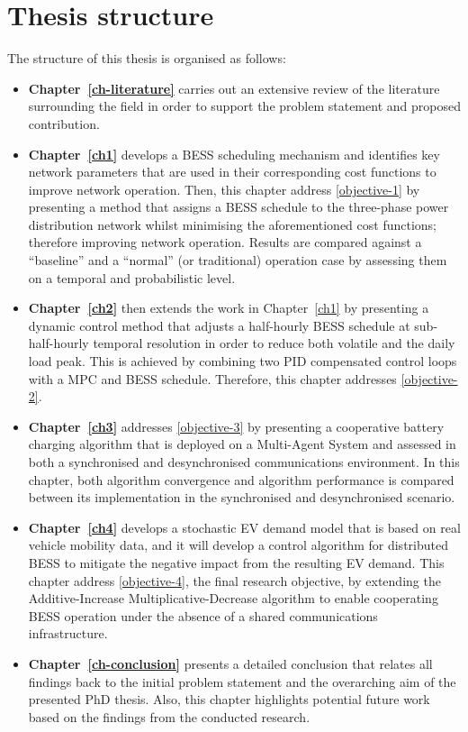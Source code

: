 \section{Thesis structure}
\label{ch-introduction:sec:thesis-structure}

The structure of this thesis is organised as follows:

\begin{itemize}
	\item
	\textbf{Chapter~\ref{ch-literature}} carries out an extensive review of the literature surrounding the field in order to support the problem statement and proposed contribution.
	\item
	\textbf{Chapter~\ref{ch1}} develops a BESS scheduling mechanism and identifies key network parameters that are used in their corresponding cost functions to improve network operation.
	Then, this chapter address \ref{objective-1} by presenting a method that assigns a BESS schedule to the three-phase power distribution network whilst minimising the aforementioned cost functions; therefore improving network operation.
	Results are compared against a ``baseline'' and a ``normal'' (or traditional) operation case by assessing them on a temporal and probabilistic level.
	\item
	\textbf{Chapter~\ref{ch2}} then extends the work in Chapter~\ref{ch1} by presenting a dynamic control method that adjusts a half-hourly BESS schedule at sub-half-hourly temporal resolution in order to reduce both volatile and the daily load peak.
	This is achieved by combining two PID compensated control loops with a MPC and BESS schedule.
	Therefore, this chapter addresses \ref{objective-2}.
	\item
	\textbf{Chapter~\ref{ch3}} addresses \ref{objective-3} by presenting a cooperative battery charging algorithm that is deployed on a Multi-Agent System and assessed in both a synchronised and desynchronised communications environment.
	In this chapter, both algorithm convergence and algorithm performance is compared between its implementation in the synchronised and desynchronised scenario.
	\item
	\textbf{Chapter~\ref{ch4}} develops a stochastic EV demand model that is based on real vehicle mobility data, and it will develop a control algorithm for distributed BESS to mitigate the negative impact from the resulting EV demand.
	This chapter address \ref{objective-4}, the final research objective, by extending the Additive-Increase Multiplicative-Decrease algorithm to enable cooperating BESS operation under the absence of a shared communications infrastructure.
	\item
	\textbf{Chapter~\ref{ch-conclusion}} presents a detailed conclusion that relates all findings back to the initial problem statement and the overarching aim of the presented PhD thesis.
	Also, this chapter highlights potential future work based on the findings from the conducted research.
\end{itemize}